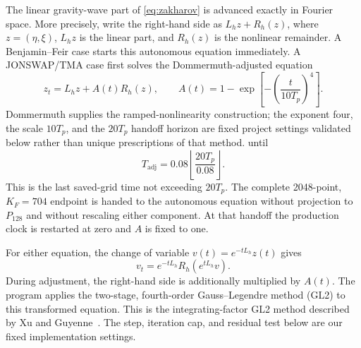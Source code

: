 \documentclass[10pt]{article}
\begin{document}
The linear gravity-wave part of \eqref{eq:zakharov} is advanced exactly in
Fourier space.  More precisely, write the right-hand side as
$L_hz+R_h(z)$, where $z=(\eta,\xi)$, $L_hz$ is the linear part, and $R_h(z)$
is the nonlinear remainder.  A Benjamin--Feir case starts this autonomous
equation immediately.  A JONSWAP/TMA case first solves the
Dommermuth-adjusted equation~\cite{dommermuth2000}
\begin{equation}
  z_t=L_hz+A(t)R_h(z),
  \qquad
  A(t)=1-\exp\!\left[-\left(\frac{t}{10T_p}\right)^4\right].
  \label{eq:jonswap-adjustment}
\end{equation}
Dommermuth supplies the ramped-nonlinearity construction; the exponent four,
the scale $10T_p$, and the $20T_p$ handoff horizon are fixed project
settings validated below rather than unique prescriptions of that method.
until
\begin{equation}
  T_{\mathrm{adj}}
  =0.08\left\lfloor\frac{20T_p}{0.08}\right\rfloor.
  \label{eq:jonswap-adjustment-time}
\end{equation}
This is the last saved-grid time not exceeding $20T_p$.  The complete
2048-point, $K_F=704$ endpoint is handed to the autonomous equation without projection
to $P_{128}$ and without rescaling either component.  At that handoff the
production clock is restarted at zero and $A$ is fixed to one.

For either equation, the change of variable
$v(t)=e^{-tL_h}z(t)$ gives
\[
  v_t=e^{-tL_h}R_h(e^{tL_h}v).
\]
During adjustment, the right-hand side is additionally multiplied by $A(t)$.
The program applies the two-stage, fourth-order Gauss--Legendre method
(GL2) to this transformed equation.  This is the integrating-factor GL2
method described by Xu and Guyenne~\cite{xu2009}.  The step, iteration cap,
and residual test below are our fixed implementation settings.
\end{document}
